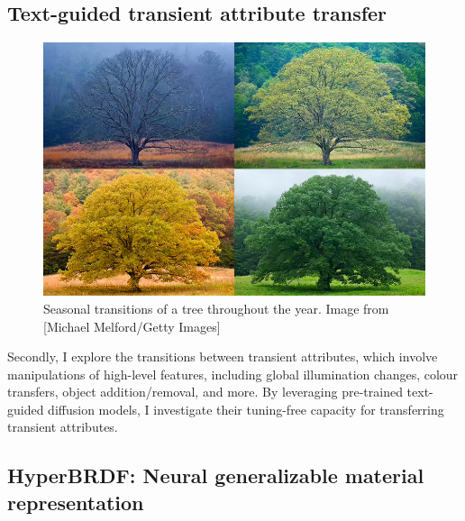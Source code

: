 
\subsection{Text-guided transient attribute transfer} 

\begin{figure}[ht]
  \centering

    \includegraphics[width=\linewidth]{Images/seasonchanges.png}

   \caption{Seasonal transitions of a tree throughout the year. Image from [Michael Melford/Getty Images]}
   \label{fig:TAT-overview}
\end{figure}

Secondly, I explore the transitions between transient attributes, which involve manipulations of high-level features, including global illumination changes, colour transfers, object addition/removal, and more. By leveraging pre-trained text-guided diffusion models, I investigate their tuning-free capacity for transferring transient attributes.

\subsection{HyperBRDF: Neural generalizable material representation}

